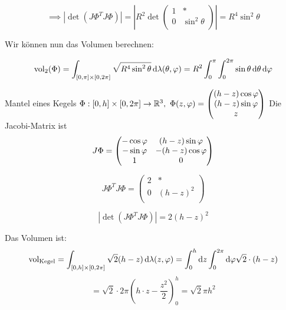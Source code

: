 \documentclass[12pt]{article}
\begin{document}
\begin{example}{}{}
    $$
        \implies |\det(J\Phi^T J\Phi)| = |R^2 \det\begin{pmatrix}
                1 & * \\
                0 & \sin^2\theta \\
            \end{pmatrix}| = R^4 \sin^2\theta
    $$

    Wir können nun das Volumen berechnen:

    $$
        \mathrm{vol_2}(\Phi) = \int_{[0, \pi] \times [0, 2\pi]} \sqrt{R^4 \sin^2\theta} \mathop{}\!\mathrm{d} \lambda(\theta, \varphi) = R^2 \int_{0}^{\pi}\int_{0}^{2\pi} \sin\theta \mathop{}\!\mathrm{d} \theta  \mathop{}\!\mathrm{d} \varphi
    $$

\end{example}

\begin{example}{Mantel eines Kegels}{}
    $\Phi: [0, h]\times[0,2\pi]\rightarrow \mathbb{R}^3,\ \Phi(z, \varphi) = \begin{pmatrix} (h-z)\cos\varphi \\ (h-z)\sin\varphi \\ z \end{pmatrix}$ Die Jacobi-Matrix ist
    $$
        J \Phi = \begin{pmatrix}
            -\cos\varphi & (h-z) \sin\varphi \\
            -\sin\varphi & -(h-z) \cos\varphi \\
            1 & 0 \\
        \end{pmatrix}
    $$

    $$
        J \Phi^T J \Phi = \begin{pmatrix}
            2 & * \\
            0 & (h-z)^2 \\
        \end{pmatrix}
    $$

    $$
        |\det(J \Phi^TJ \Phi)| = 2(h-z)^2
    $$

    Das Volumen ist:
    $$
        \mathrm{vol}_{\text{Kegel}} = \int_{[0, h]\times[0, 2\pi]} \sqrt{2}(h-z) \mathop{}\!\mathrm{d} \lambda(z, \varphi) = \int_{0}^{h} \mathop{}\!\mathrm{d} z \int_{0}^{2\pi} \mathop{}\!\mathrm{d} \varphi \sqrt{2} \cdot (h - z)
    $$
    $$
        = \sqrt{2} \cdot 2 \pi \left(h \cdot z - \frac{z^2}{2}\right)_0^h = \boxed{\sqrt{2} \pi h^2}
    $$
\end{example}
\end{document}
